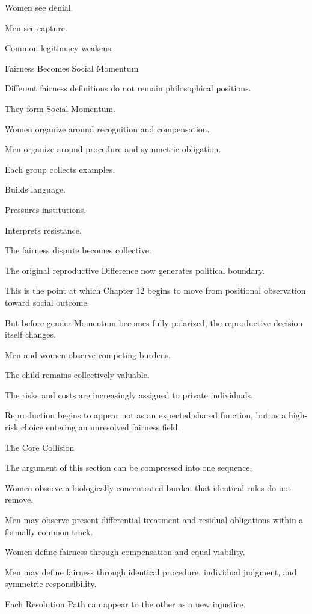Women see denial.

Men see capture.

Common legitimacy weakens.

Fairness Becomes Social Momentum

Different fairness definitions do not remain philosophical positions.

They form Social Momentum.

Women organize around recognition and compensation.

Men organize around procedure and symmetric obligation.

Each group collects examples.

Builds language.

Pressures institutions.

Interprets resistance.

The fairness dispute becomes collective.

The original reproductive Difference now generates political boundary.

This is the point at which Chapter 12 begins to move from positional observation toward social outcome.

But before gender Momentum becomes fully polarized, the reproductive decision itself changes.

Men and women observe competing burdens.

The child remains collectively valuable.

The risks and costs are increasingly assigned to private individuals.

Reproduction begins to appear not as an expected shared function, but as a high-risk choice entering an unresolved fairness field.

The Core Collision

The argument of this section can be compressed into one sequence.

Women observe a biologically concentrated burden that identical rules do not remove.

Men may observe present differential treatment and residual obligations within a formally common track.

Women define fairness through compensation and equal viability.

Men may define fairness through identical procedure, individual judgment, and symmetric responsibility.

Each Resolution Path can appear to the other as a new injustice.

